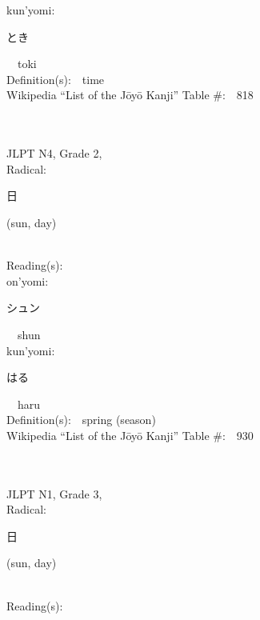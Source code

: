 \begin{multicols}{2}
{\hspace*{1em}}kun'yomi:\ \ \\
{\hspace*{2em}}{\begin{CJK}{UTF8}{min} とき \end{CJK}}\ \ toki\ \ \\
Definition(s):\ \ time \\
Wikipedia ``List of the J\=oy\=o Kanji'' Table \#:\ \ 818 \\
\ \ \\
{\fontsize{34pt}{40pt}  }\ \ \\  %
{JLPT N4, Grade 2, \\Radical:\ \ {\begin{CJK}{UTF8}{min} 日 \end{CJK}} (sun, day) } \\
Reading(s):\ \ \\
{\hspace*{1em}}on'yomi:\ \ \\
{\hspace*{2em}}{\begin{CJK}{UTF8}{min} シュン \end{CJK}}\ \ shun\ \ \\
{\hspace*{1em}}kun'yomi:\ \ \\
{\hspace*{2em}}{\begin{CJK}{UTF8}{min} はる \end{CJK}}\ \ haru\ \ \\
Definition(s):\ \ spring (season) \\
Wikipedia ``List of the J\=oy\=o Kanji'' Table \#:\ \ 930 \\
\ \ \\
{\fontsize{34pt}{40pt}  }\ \ \\  %
{JLPT N1, Grade 3, \\Radical:\ \ {\begin{CJK}{UTF8}{min} 日 \end{CJK}} (sun, day) } \\
Reading(s):\ \ \\

\end{multicols}

